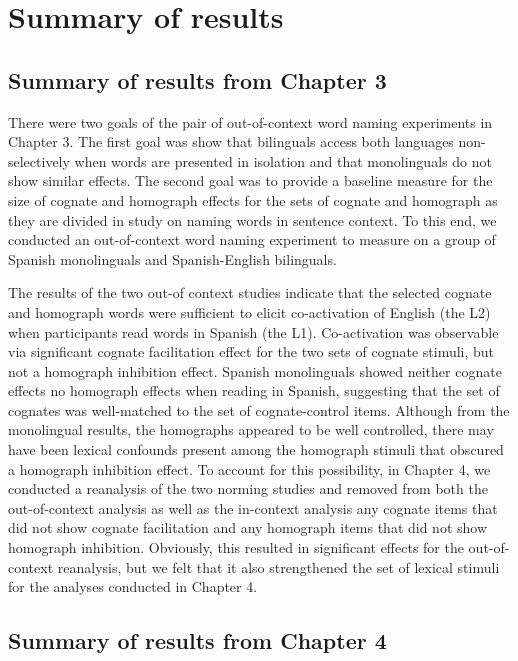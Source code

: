 \section{Summary of results}
\label{summaryofresults}

\subsection{Summary of results from Chapter 3}
\label{summaryofresultsfromchapter3}

There were two goals of the pair of out-of-context word naming experiments in Chapter 3. The first goal was show that bilinguals access both languages non-selectively when words are presented in isolation and that monolinguals do not show similar effects. The second goal was to provide a baseline measure for the size of cognate and homograph effects for the sets of cognate and homograph as they are divided in study on naming words in sentence context. To this end, we conducted an out-of-context word naming experiment to measure on a group of Spanish monolinguals and Spanish-English bilinguals. 

The results of the two out-of context studies indicate that the selected cognate and homograph words were sufficient to elicit co-activation of English (the L2) when participants read words in Spanish (the L1). Co-activation was observable via significant cognate facilitation effect for the two sets of cognate stimuli, but not a homograph inhibition effect. Spanish monolinguals showed neither cognate effects no homograph effects when reading in Spanish, suggesting that the set of cognates was well-matched to the set of cognate-control items. Although from the monolingual results, the homographs appeared to be well controlled, there may have been lexical confounds present among the homograph stimuli that obscured a homograph inhibition effect. To account for this possibility, in Chapter 4, we conducted a reanalysis of the two norming studies and removed from both the out-of-context analysis as well as the in-context analysis any cognate items that did not show cognate facilitation and any homograph items that did not show homograph inhibition. Obviously, this resulted in significant effects for the out-of-context reanalysis, but we felt that it also strengthened the set of lexical stimuli for the analyses conducted in Chapter 4.

\subsection{Summary of results from Chapter 4}
\label{summaryofresultsfromchapter4}

